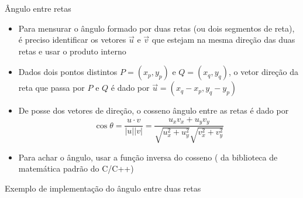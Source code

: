\begin{frame}[fragile]{Ângulo entre retas}

    \begin{itemize}
        \item Para mensurar o ângulo formado por duas retas (ou dois segmentos de reta), é preciso
            identificar os vetores $\vec{u}$ e $\vec{v}$ que estejam na mesma direção das duas retas e usar o produto interno
        \pause

        \item Dados dois pontos distintos $P = (x_p, y_p)$ e $Q = (x_q, y_q)$, o vetor direção da
            reta que passa por $P$ e $Q$ é dado por $\vec{u} = (x_q - x_p, y_q - y_p)$
        \pause

        \item De posse dos vetores de direção, o cosseno ângulo entre as retas é dado por
        \[
            \cos \theta = \frac{u \cdot v}{|u||v|} = \frac{u_xv_x + u_yv_y}{\sqrt{u_x^2 + u_y^2}\sqrt{v_x^2 + v_y^2}}
        \]
        \pause

        \item Para achar o ângulo, usar a função inversa do cosseno ( da
            biblioteca de matemática padrão do C/C++) 
    \end{itemize}

\end{frame}

\begin{frame}[fragile]{Exemplo de implementação do ângulo entre duas retas}
\end{frame}

